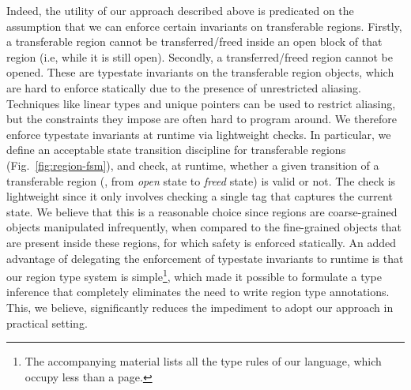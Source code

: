 Indeed, the utility of our approach described above is predicated
on the assumption that we can enforce certain invariants on
transferable regions. Firstly, a transferable region cannot be
transferred/freed inside an open block of that region (i.e, while it
is still open).  Secondly, a transferred/freed region cannot be
opened. These are typestate invariants on the transferable region
objects, which are hard to enforce statically due to the presence of
unrestricted aliasing. Techniques like linear types and unique
pointers can be used to restrict aliasing, but the constraints they
impose are often hard to program around. We therefore enforce
typestate invariants at runtime via lightweight checks. In
particular, we define an acceptable state transition discipline for
transferable regions (Fig.~\ref{fig:region-fsm}), and check, at
runtime, whether a given transition of a transferable region (\eg,
from \emph{open} state to \emph{freed} state) is valid or not. The
check is lightweight since it only involves checking a single tag that
captures the current state.  We believe that this is a reasonable
choice since regions are coarse-grained objects manipulated
infrequently, when compared to the fine-grained objects that are
present inside these regions, for which safety is enforced statically.
An added advantage of delegating the enforcement of typestate
invariants to runtime is that our region type system is
simple\footnote{The accompanying material lists all the type rules of our language,
which occupy less than a page.}, which made it possible to formulate a
type inference that completely eliminates the need to write region
type annotations. This, we believe, significantly reduces the
impediment to adopt our approach in practical setting.



